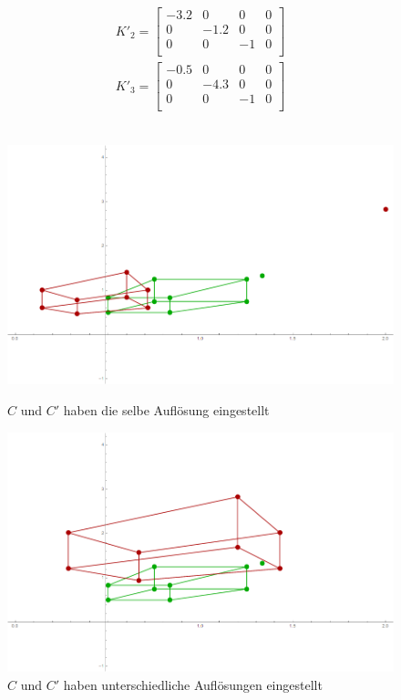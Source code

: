 \begin{gather}
K'_2 = \begin{bmatrix}
-3.2&0&0&0\\
0&-1.2&0&0\\
0&0&-1&0\\
\end{bmatrix}\\
K'_3 = \begin{bmatrix}
-0.5&0&0&0\\
0&-4.3&0&0\\
0&0&-1&0\\
\end{bmatrix}
\end{gather}\\


\begin{figure}[!htb]
	\includegraphics[width=\linewidth]{images/Zeta1.png}
	\caption{$C$ und $C'$ haben die selbe Auflösung eingestellt}
	\label{fig:awesome_image1}
	\endminipage\hfill
	\includegraphics[width=\linewidth]{images/Zeta2.png}
	\caption{$C$ und $C'$ haben unterschiedliche Auflösungen eingestellt}
	\label{fig:awesome_image2}
	\endminipage\hfill
\end{figure}

